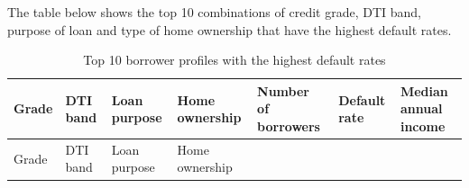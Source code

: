 \documentclass[11pt,preprint]{elsarticle}
\numberwithin{equation}{section}
\numberwithin{figure}{section}
\numberwithin{table}{section}
\begin{document}
The table below shows the top 10 combinations of credit grade, DTI band,
purpose of loan and type of home ownership that have the highest default
rates.

\begin{longtable}[]{@{}
  >{\centering\arraybackslash}p{}
  >{\centering\arraybackslash}p{}
  >{\centering\arraybackslash}p{}
  >{\centering\arraybackslash}p{}
  >{\centering\arraybackslash}p{}
  >{\centering\arraybackslash}p{}
  >{\centering\arraybackslash}p{}@{}}
\caption{Top 10 borrower profiles with the highest default
rates}\tabularnewline
\toprule\noalign{}
\begin{minipage}[b]{\linewidth}\centering
Grade
\end{minipage} & \begin{minipage}[b]{\linewidth}\centering
DTI band
\end{minipage} & \begin{minipage}[b]{\linewidth}\centering
Loan purpose
\end{minipage} & \begin{minipage}[b]{\linewidth}\centering
Home ownership
\end{minipage} & \begin{minipage}[b]{\linewidth}\centering
Number of borrowers
\end{minipage} & \begin{minipage}[b]{\linewidth}\centering
Default rate
\end{minipage} & \begin{minipage}[b]{\linewidth}\centering
Median annual income
\end{minipage} \\
\midrule\noalign{}
\endfirsthead
\toprule\noalign{}
\begin{minipage}[b]{\linewidth}\centering
Grade
\end{minipage} & \begin{minipage}[b]{\linewidth}\centering
DTI band
\end{minipage} & \begin{minipage}[b]{\linewidth}\centering
Loan purpose
\end{minipage} & \begin{minipage}[b]{\linewidth}\centering
Home ownership

\end{minipage}
\end{longtable}
\end{document}
